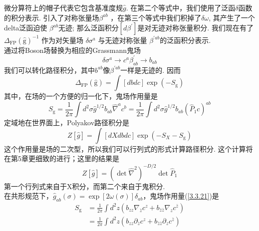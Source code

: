 微分算符上的帽子代表它包含基准度规$\hat{g}$. 在第二个等式中，我们使用了泛函$\delta$函数的积分表示. 引入了对称张量场$\beta^{a b} $
，在第三个等式中我们积掉了$\delta \omega$, 其产生了一个delta泛函迫使 $\beta^{a b}$无迹; 那么泛函积分$\left[d \beta^{\prime}\right]$是对无迹对称张量积分. 我们现在有了 $\Delta_{\mathrm{FP}}(\hat{\mathrm{g}})^{-1}$ 作为对矢量场 $\delta \sigma^{a}$ 与无迹对称张量 $\beta^{\prime a b}$的泛函积分表示.\\
通过将Boson场替换为相应的Grassmann鬼场
\begin{subequations}
\begin{equation}
\delta \sigma^{a} \rightarrow c^{a}
\end{equation}
\begin{equation}
\beta_{a b}^{\prime} \rightarrow b_{a b}
\end{equation}
\end{subequations}
我们可以转化路径积分，其中$b^{a b}$像$\beta^{\prime a b}$一样是无迹的. 因而
\begin{equation}
\Delta_{\mathrm{FP}}(\hat{\mathrm{g}})=\int[d b d c] \exp \left(-S_{\mathrm{g}}\right)
\end{equation}
其中，在场的一个方便的归一化下，鬼场作用量是
\begin{equation}\label{3.3.21}
S_{\mathrm{g}}=\frac{1}{2 \pi} \int d^{2} \sigma \hat{g}^{1 / 2} b_{a b} \hat{\nabla}^{a} c^{b}=\frac{1}{2 \pi} \int d^{2} \sigma \hat{g}^{1 / 2} b_{a b}\left(\hat{P}_{1} c\right)^{a b}
\end{equation}
定域地在世界面上，Polyakov路径积分是
\begin{equation}\label{3.3.22}
Z[\hat{g}]=\int[d X d b d c] \exp \left(-S_{X}-S_{\mathrm{g}}\right)
\end{equation}
这个作用量是场的二次型，所以我们可以行列式的形式计算路径积分. 这个计算将在第5章更细致的进行；这里的结果是
\begin{equation}
Z[\hat{g}]=\left(\operatorname{det} \hat{\nabla}^{2}\right)^{-D / 2} \operatorname{det} \hat{P}_{1}
\end{equation}
第一个行列式来自于X积分，而第二个来自于鬼积分.\\
在共形规范下，$\hat{g}_{a b}(\sigma)=\exp [2 \omega(\sigma)] \delta_{a b}$，鬼场作用量(\ref{3.3.21})是
\begin{equation}
\begin{aligned}
S_{\mathrm{g}} &=\frac{1}{2 \pi} \int d^{2} z\left(b_{z z} \nabla_{\bar{z}} c^{z}+b_{\bar{z} \bar{z}} \nabla_{z} c^{\bar{z}}\right) \\
&=\frac{1}{2 \pi} \int d^{2} z\left(b_{z z} \partial_{\bar{z}} c^{z}+b_{\bar{z} \bar{z}} \partial_{z} c^{\bar{z}}\right)
\end{aligned}
\end{equation}
